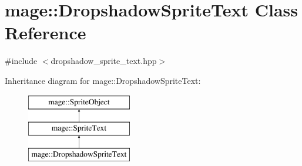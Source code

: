 \hypertarget{classmage_1_1_dropshadow_sprite_text}{}\section{mage\+:\+:Dropshadow\+Sprite\+Text Class Reference}
\label{classmage_1_1_dropshadow_sprite_text}


{\ttfamily \#include $<$dropshadow\+\_\+sprite\+\_\+text.\+hpp$>$}

Inheritance diagram for mage\+:\+:Dropshadow\+Sprite\+Text\+:\begin{figure}[H]
\begin{center}
\leavevmode
\includegraphics[height=3.000000cm]{classmage_1_1_dropshadow_sprite_text}
\end{center}
\end{figure}
